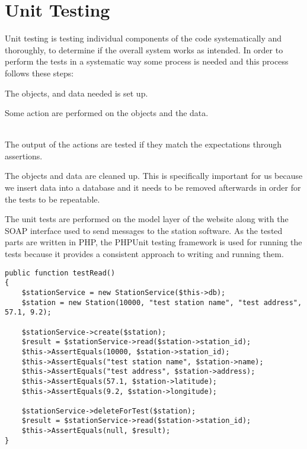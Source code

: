 \section{Unit Testing}
Unit testing is testing individual components of the code systematically and thoroughly, to determine if the overall system works as intended.
In order to perform the tests in a systematic way some process is needed and this process follows these steps:

\begin{description}[style=nextline]
\item[Set Up] The objects, and data needed is set up.
\item[Action] Some action are performed on the objects and the data.
\item[Test] \hfill \\ 
The output of the actions are tested if they match the expectations through assertions.
\item[Tear Down/Clean Up] The objects and data are cleaned up. This is specifically important for us because we insert data into a database and it needs to be removed afterwards in order for the tests to be repeatable.
\end{description}

The unit tests are performed on the model layer of the website along with the SOAP interface used to send messages to the station software.
As the tested parts are written in PHP, the PHPUnit testing framework is used for running the tests because it provides a consistent approach to writing and running them.

\begin{lstlisting}[caption = {Example of a unit test.}, label = {lst:unitTestExample}]
public function testRead()
{
	$stationService = new StationService($this->db);
	$station = new Station(10000, "test station name", "test address", 57.1, 9.2);

	$stationService->create($station);
	$result = $stationService->read($station->station_id);
	$this->AssertEquals(10000, $station->station_id);
	$this->AssertEquals("test station name", $station->name);
	$this->AssertEquals("test address", $station->address);
	$this->AssertEquals(57.1, $station->latitude);
	$this->AssertEquals(9.2, $station->longitude);

	$stationService->deleteForTest($station);
	$result = $stationService->read($station->station_id);
	$this->AssertEquals(null, $result);
}
\end{lstlisting}

